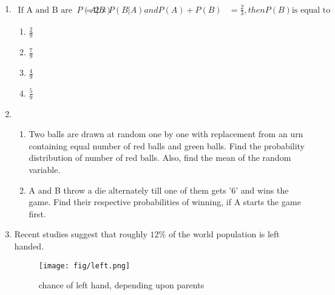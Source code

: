 \documentclass{article}
\begin{document}
\begin{enumerate}
	\item \begin{align}
\text {If A and B are two events such that} P(A|B) & = 2 \times  P(B|A) and P(A) + P(B) & = \frac{2}{3}, then P(B)  \text {is equal to}
\end{align}
\begin{enumerate}
\item $\frac{2}{9}$
\item $\frac{7}{9}$
\item $\frac{4}{9}$
\item $\frac{5}{9}$
\end{enumerate}

\item
\begin{enumerate}
\item Two balls are drawn at random one by one with replacement from an urn containing equal number of red balls and green balls. Find the probability distribution of number of red balls. Also, find the mean of the random variable.
\item A and B throw a die alternately till one of them gets '6' and wins the game. Find their respective probabilities of winning, if A starts the game first.
\end{enumerate}

\item Recent studies suggest that roughly $12\%$ of the world population is left handed.
	
\begin{figure}[h!]
\centering
\texttt{[image: fig/left.png]}
\caption{chance of left hand, depending upon parents}
\label{fig:left.png}
\end{figure}


\end{enumerate}
\end{document}
